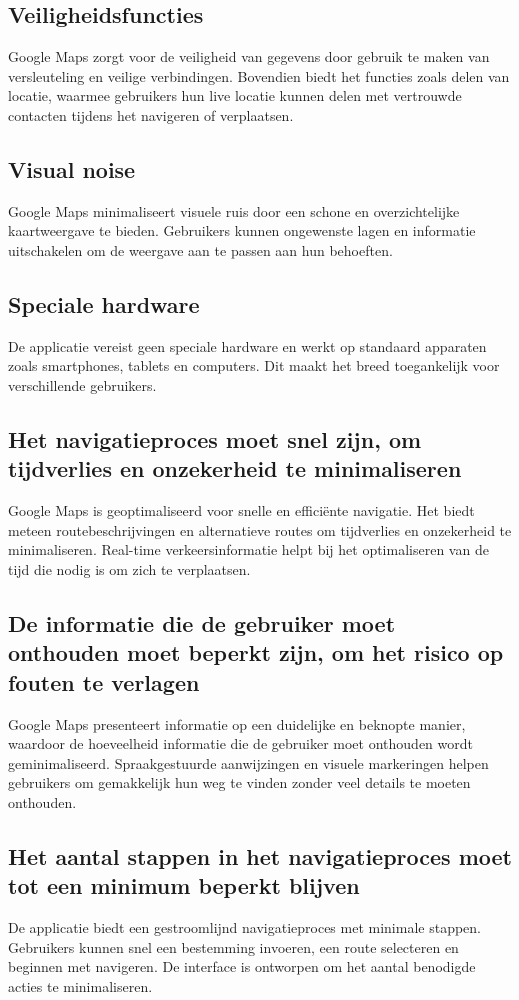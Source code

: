 \subsection*{Veiligheidsfuncties}
Google Maps zorgt voor de veiligheid van gegevens door gebruik te maken van versleuteling en veilige verbindingen. Bovendien biedt het functies zoals delen van locatie, waarmee gebruikers hun live locatie kunnen delen met vertrouwde contacten tijdens het navigeren of verplaatsen.

\subsection*{Visual noise}
Google Maps minimaliseert visuele ruis door een schone en overzichtelijke kaartweergave te bieden. Gebruikers kunnen ongewenste lagen en informatie uitschakelen om de weergave aan te passen aan hun behoeften.

\subsection*{Speciale hardware}
De applicatie vereist geen speciale hardware en werkt op standaard apparaten zoals smartphones, tablets en computers. Dit maakt het breed toegankelijk voor verschillende gebruikers.

\subsection*{Het navigatieproces moet snel zijn, om tijdverlies en onzekerheid te minimaliseren}
Google Maps is geoptimaliseerd voor snelle en efficiënte navigatie. Het biedt meteen routebeschrijvingen en alternatieve routes om tijdverlies en onzekerheid te minimaliseren. Real-time verkeersinformatie helpt bij het optimaliseren van de tijd die nodig is om zich te verplaatsen.

\subsection*{De informatie die de gebruiker moet onthouden moet beperkt zijn, om het risico op fouten te verlagen}
Google Maps presenteert informatie op een duidelijke en beknopte manier, waardoor de hoeveelheid informatie die de gebruiker moet onthouden wordt geminimaliseerd. Spraakgestuurde aanwijzingen en visuele markeringen helpen gebruikers om gemakkelijk hun weg te vinden zonder veel details te moeten onthouden.

\subsection*{Het aantal stappen in het navigatieproces moet tot een minimum beperkt blijven}
De applicatie biedt een gestroomlijnd navigatieproces met minimale stappen. Gebruikers kunnen snel een bestemming invoeren, een route selecteren en beginnen met navigeren. De interface is ontworpen om het aantal benodigde acties te minimaliseren.

